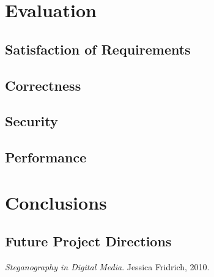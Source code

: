 \documentclass[paper=a4, fontsize=11pt,twoside]{scrartcl}    %
\begin{document}
\section{Evaluation}
\subsection{Satisfaction of Requirements}
\subsection{Correctness}
\subsection{Security}
\subsection{Performance}

\section{Conclusions}
\subsection{Future Project Directions}


\begin{thebibliography}{1}

  \emph{Steganography in Digital Media}.
  Jessica Fridrich, 2010.

\end{thebibliography}
\end{document}
